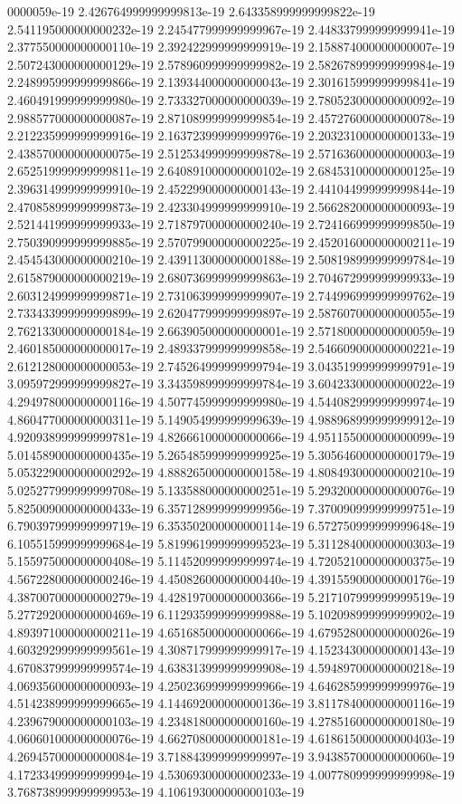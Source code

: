 0000059e-19	2.426764999999999813e-19	2.643358999999999822e-19	2.541195000000000232e-19	2.245477999999999967e-19	2.448337999999999941e-19	2.377550000000000110e-19	2.392422999999999919e-19	2.158874000000000007e-19	2.507243000000000129e-19	2.578960999999999982e-19	2.582678999999999984e-19	2.248995999999999866e-19	2.139344000000000043e-19	2.301615999999999841e-19	2.460491999999999980e-19	2.733327000000000039e-19	2.780523000000000092e-19	2.988577000000000087e-19	2.871089999999999854e-19	2.457276000000000078e-19	2.212235999999999916e-19	2.163723999999999976e-19	2.203231000000000133e-19	2.438570000000000075e-19	2.512534999999999878e-19	2.571636000000000003e-19	2.652519999999999811e-19	2.640891000000000102e-19	2.684531000000000125e-19	2.396314999999999910e-19	2.452299000000000143e-19	2.441044999999999844e-19	2.470858999999999873e-19	2.423304999999999910e-19	2.566282000000000093e-19	2.521441999999999933e-19	2.718797000000000240e-19	2.724166999999999850e-19	2.750390999999999885e-19	2.570799000000000225e-19	2.452016000000000211e-19	2.454543000000000210e-19	2.439113000000000188e-19	2.508198999999999784e-19	2.615879000000000219e-19	2.680736999999999863e-19	2.704672999999999933e-19	2.603124999999999871e-19	2.731063999999999907e-19	2.744996999999999762e-19	2.733433999999999899e-19	2.620477999999999897e-19	2.587607000000000055e-19	2.762133000000000184e-19	2.663905000000000001e-19	2.571800000000000059e-19	2.460185000000000017e-19	2.489337999999999858e-19	2.546609000000000221e-19	2.612128000000000053e-19	2.745264999999999794e-19	3.043519999999999791e-19	3.095972999999999827e-19	3.343598999999999784e-19	3.604233000000000022e-19	4.294978000000000116e-19	4.507745999999999980e-19	4.544082999999999974e-19	4.860477000000000311e-19	5.149054999999999639e-19	4.988968999999999912e-19	4.920938999999999781e-19	4.826661000000000066e-19	4.951155000000000099e-19	5.014589000000000435e-19	5.265485999999999925e-19	5.305646000000000179e-19	5.053229000000000292e-19	4.888265000000000158e-19	4.808493000000000210e-19	5.025277999999999708e-19	5.133588000000000251e-19	5.293200000000000076e-19	5.825009000000000433e-19	6.357128999999999956e-19	7.370090999999999751e-19	6.790397999999999719e-19	6.353502000000000114e-19	6.572750999999999648e-19	6.105515999999999684e-19	5.819961999999999523e-19	5.311284000000000303e-19	5.155975000000000408e-19	5.114520999999999974e-19	4.720521000000000375e-19	4.567228000000000246e-19	4.450826000000000440e-19	4.391559000000000176e-19	4.387007000000000279e-19	4.428197000000000366e-19	5.217107999999999519e-19	5.277292000000000469e-19	6.112935999999999988e-19	5.102098999999999902e-19	4.893971000000000211e-19	4.651685000000000066e-19	4.679528000000000026e-19	4.603292999999999561e-19	4.308717999999999917e-19	4.152343000000000143e-19	4.670837999999999574e-19	4.638313999999999908e-19	4.594897000000000218e-19	4.069356000000000093e-19	4.250236999999999966e-19	4.646285999999999976e-19	4.514238999999999665e-19	4.144692000000000136e-19	3.811784000000000116e-19	4.239679000000000103e-19	4.234818000000000160e-19	4.278516000000000180e-19	4.060601000000000076e-19	4.662708000000000181e-19	4.618615000000000403e-19	4.269457000000000084e-19	3.718843999999999997e-19	3.943857000000000060e-19	4.172334999999999994e-19	4.530693000000000233e-19	4.007780999999999998e-19	3.768738999999999953e-19	4.106193000000000103e-19